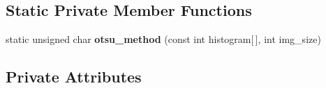 \subsection*{Static Private Member Functions}
\begin{DoxyCompactItemize}
\item 
\hypertarget{classofeli_1_1_image_viewer_ab98cf1e4b8593532d5527d49bbb1875b}{static unsigned char {\bfseries otsu\-\_\-method} (const int histogram\mbox{[}$\,$\mbox{]}, int img\-\_\-size)}\label{classofeli_1_1_image_viewer_ab98cf1e4b8593532d5527d49bbb1875b}

\end{DoxyCompactItemize}
\subsection*{Private Attributes}
